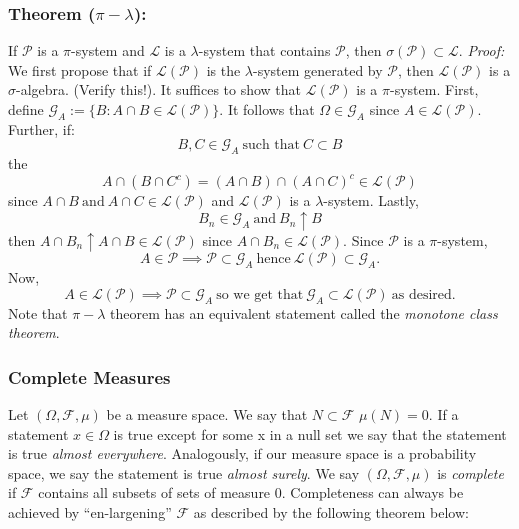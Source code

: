 \documentclass{article}
\begin{document}
\subsubsection{Theorem ($\pi-\lambda$):}
If $\mathcal{P}$ is a $\pi$-system and $\mathcal{L}$ is a $\lambda$-system that contains $\mathcal{P}$, then $\sigma(\mathcal{P})\subset\mathcal{L}$. \newline \newline 
\textit{Proof:} \newline \newline
We first propose that if  $\mathcal{L}(\mathcal{P})$ is the $\lambda$-system generated by $\mathcal{P}$, then $\mathcal{L}(\mathcal{P})$ is a $\sigma$-algebra. (Verify this!). It suffices to show that $\mathcal{L}(\mathcal{P})$ is a $\pi$-system.\newline \newline
First, define $\mathcal{G}_A :=\{B:A\cap B\in \mathcal{L}(\mathcal{P})\}$. \newline \newline
It follows that $\Omega \in \mathcal{G}_A$ since $A \in  \mathcal{L}(\mathcal{P})$. Further, if:
\[
B,C \in \mathcal{G}_A \ \text{such that} \ C \subset B
\] 
the
\[
A \cap (B\cap C^c) = (A\cap B) \cap (A\cap C)^c \in \mathcal{L}(\mathcal{P})
\]
since $A\cap B \ \text{and}\  A\cap C \in \mathcal{L}(\mathcal{P})$ and $\mathcal{L}(\mathcal{P})$ is a $\lambda$-system. \newline \newline
Lastly, 
\[
B_n \in \mathcal{G}_A \ \text{and} \ B_n \uparrow B
\]
then $A \cap B_n \uparrow A \cap B \in \mathcal{L}(\mathcal{P})$ since $A \cap B_n \in \mathcal{L}(\mathcal{P})$.
Since $\mathcal{P}$ is a $\pi$-system, 
\[
A \in \mathcal{P} \implies \mathcal{P} \subset\mathcal{G}_A \ \text{hence} \ \mathcal{L}(\mathcal{P}) \subset\mathcal{G}_A.
\]
Now,
\[
A \in \mathcal{L}(\mathcal{P}) \implies \mathcal{P} \subset\mathcal{G}_A \ \text{so we get that} \ \mathcal{G}_A \subset \mathcal{L}(\mathcal{P}) \  \text{as desired.}
\]
Note that $\pi-\lambda$ theorem has an equivalent statement called the \emph{monotone class theorem}.

\subsubsection{Complete Measures}
Let $(\Omega, \mathcal{F}, \mu)$ be a measure space. We say that $N\subset\mathcal{F}$  $\mu(N) = 0$. \newline \newline
If a statement $x\in \Omega$ is true except for some x in a null set we say that the statement is true \textit{almost everywhere}. Analogously, if our measure space is a probability space, we say the statement is true \emph{almost surely}. \newline \newline
We say $(\Omega, \mathcal{F}, \mu)$ is \emph{complete} if  $\mathcal{F}$ contains all subsets of sets of measure 0. Completeness can always be achieved by ``en-largening'' $\mathcal{F}$ as described by the following theorem below:
\end{document}
